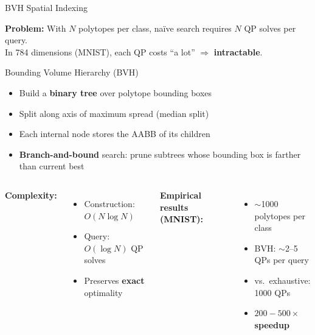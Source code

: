 \documentclass[aspectratio=169, 10pt]{beamer}
\begin{document}
\begin{frame}{BVH Spatial Indexing}

\textbf{Problem:} With $N$ polytopes per class, na\"ive search requires $N$ QP solves per query.\\
In 784 dimensions (MNIST), each QP costs \enquote{a lot} $\Rightarrow$ \textbf{intractable}.

\bigskip

\begin{block}{Bounding Volume Hierarchy (BVH)}
\begin{itemize}
  \item Build a \textbf{binary tree} over polytope bounding boxes
  \item Split along axis of maximum spread (median split)
  \item Each internal node stores the AABB of its children
  \item \textbf{Branch-and-bound} search: prune subtrees whose bounding box is farther than current best
\end{itemize}
\end{block}

\bigskip

\begin{columns}[c]
\textbf{Complexity:}
\begin{itemize}
  \item Construction: $O(N \log N)$
  \item Query: $O(\log N)$ QP solves
  \item Preserves \textbf{exact} optimality
\end{itemize}

\textbf{Empirical results (MNIST):}
\begin{itemize}
  \item $\sim$1000 polytopes per class
  \item BVH: $\sim$2--5 QPs per query
  \item vs.\ exhaustive: 1000 QPs
  \item \textbf{$200{-}500\times$ speedup}
\end{itemize}
\end{columns}

\end{frame}
\end{document}
